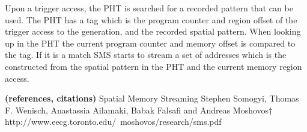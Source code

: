 Upon a trigger access, the PHT is searched for a recorded pattern that
can be used.  The PHT has a tag which is the program counter and
region offset of the trigger access to the generation, and the recorded spatial
pattern. When looking up in the PHT the current program counter and
memory offset is compared to the tag. If it is a match SMS starts to
stream a set of addresses which is the constructed from the spatial
pattern in the PHT and the current memory region access.

{\bf (references, citations)}
Spatial Memory Streaming
Stephen Somogyi, Thomas F. Wenisch,
Anastassia Ailamaki, Babak Falsafi and Andreas Moshovos†
http://www.eecg.toronto.edu/~moshovos/research/sms.pdf